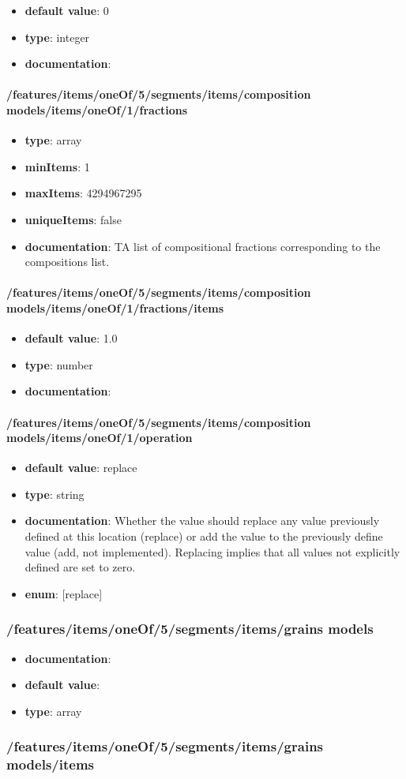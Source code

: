 \begin{itemize}\item {\bf default value}: 0
\item {\bf type}: integer
\item {\bf documentation}: 
\end{itemize}\paragraph{/features/items/oneOf/5/segments/items/composition models/items/oneOf/1/fractions}
\begin{itemize}\item {\bf type}: array
\item {\bf minItems}: 1
\item {\bf maxItems}: 4294967295
\item {\bf uniqueItems}: false
\item {\bf documentation}: TA list of compositional fractions corresponding to the compositions list.
\end{itemize}\paragraph{/features/items/oneOf/5/segments/items/composition models/items/oneOf/1/fractions/items}
\begin{itemize}\item {\bf default value}: 1.0
\item {\bf type}: number
\item {\bf documentation}: 
\end{itemize}\paragraph{/features/items/oneOf/5/segments/items/composition models/items/oneOf/1/operation}
\begin{itemize}\item {\bf default value}: replace
\item {\bf type}: string
\item {\bf documentation}: Whether the value should replace any value previously defined at this location (replace) or add the value to the previously define value (add, not implemented). Replacing implies that all values not explicitly defined are set to zero.
\item {\bf enum}: [replace]\end{itemize}\subsubsection{/features/items/oneOf/5/segments/items/grains models}
\begin{itemize}\item {\bf documentation}: 
\item {\bf default value}: 
\item {\bf type}: array
\end{itemize}\subsubsection{/features/items/oneOf/5/segments/items/grains models/items}

